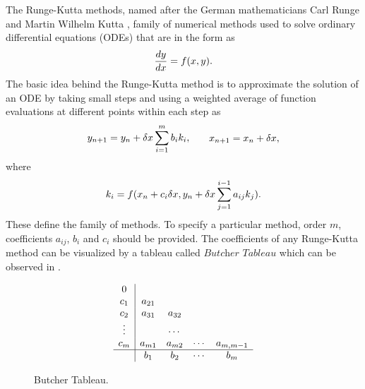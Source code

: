 \documentclass{article}
\begin{document}
The Runge-Kutta methods, named after the German mathematicians Carl Runge and Martin Wilhelm Kutta \cite{runge} \cite{kutta}, 
family of numerical methods
used to solve ordinary differential equations (ODEs) that are in the form as
\vspace{-10pt}\begin{equation} \label{eq:first-order-ODE}
    \deriv{y}{x} = f(x, y) .
\vspace{-10pt}\end{equation}
The basic idea behind the Runge-Kutta method is to approximate the solution of an ODE by taking small steps and using a weighted average 
of function evaluations at different points within each step as
\vspace{-10pt}\begin{equation} \label{eq:general-rk}
    \begin{aligned}
        y_{n+1} = y_n + \delta x \sum_{i=1}^{m} b_i k_i  ,
    \end{aligned}
    \qquad
    \begin{aligned}
        x_{n+1} = x_n + \delta x   ,
    \end{aligned}
\vspace{-10pt}\end{equation}
where 
\vspace{-10pt}\begin{eqnarray} \label{eq:general-rk-coef}
    k_i = f(x_n + c_i \delta x, y_n + \delta x \sum_{j = 1}^{i - 1}a_{ij}k_j) .
\vspace{-10pt}\end{eqnarray}
These  define the family of methods. To specify a particular method, order $m$, coefficients $a_{ij}$, $b_i$ and $c_i$ should be provided.
The coefficients of any Runge-Kutta method can be visualized by a tableau called $\textit{Butcher Tableau}$ which can be observed in .
\begin{figure}[h!]
    \[ 
    \begin{array} 
        {c|cccc}
        0\\
        c_1 & a_{21} \\
        c_2 & a_{31} & a_{32}\\
        \vdots& & \cdots& \\
        c_m & a_{m1} & a_{m2} & \cdots & a_{m,m-1}\\
        \hline
        & b_1 & b_2 &\cdots & b_m
    \end{array}
    \]
    \caption{Butcher Tableau.}
    \label{fig:Butcher}
\end{figure}
\end{document}

